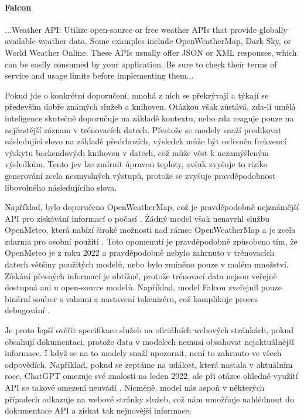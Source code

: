 \documentclass[FM,DP]{tulthesis}
\begin{document}
		\vspace{0.6em}
		\begin{tcolorbox}[colback=white,colframe=black]
			\paragraph{Falcon}
			...Weather API: Utilize open-source or free weather APIs that provide globally available weather data. Some examples include OpenWeatherMap, Dark Sky, or World Weather Online. These APIs usually offer JSON or XML responses, which can be easily consumed by your application. Be sure to check their terms of service and usage limits before implementing them... \cite{falcon_analyza}
		\end{tcolorbox}
		\vspace{0.6em}
		
		Pokud jde o konkrétní doporučení, mnohá z nich se překrývají a týkají se především dobře známých služeb a knihoven. Otázkou však zůstává, zda-li umělá inteligence skutečně doporučuje na základě kontextu, nebo zda reaguje pouze na nejčastější záznam v trénovacích datech. Přestože se modely snaží predikovat následující slovo na základě předchozích, výsledek může být ovlivněn frekvencí výskytu backendových knihoven v datech, což může vést k nezamýšleným výsledkům. Tento jev lze zmírnit úpravou teploty, avšak zvyšuje to riziko generování zcela nesmyslných výstupů, protože se zvyšuje pravděpodobnost libovolného následujícího slova.
		
		Například, bylo doporučeno OpenWeatherMap, což je pravděpodobně nejznámější API pro získávání informací o počasí \cite{bard_analyza} \cite{bingCopilot_analyza} \cite{webapp_basics} \cite{openweather}. Žádný model však nenavrhl službu OpenMeteo, která nabízí široké možnosti nad rámec OpenWeatherMap a je zcela zdarma pro osobní použití \cite{openmeteo}. Toto opomenutí je pravděpodobně způsobeno tím, že OpenMeteo je z roku 2022 a pravděpodobně nebylo zahrnuto v trénovacích datech většiny použitých modelů, nebo bylo zmíněno pouze v malém množství. Získání přesných informací je obtížné, protože trénovací data nejsou veřejně dostupná ani u open-source modelů. Například, model Falcon zveřejnil pouze binární soubor s vahami a nastavení tokenizéru, což komplikuje proces debugování \cite{falcon}.
		
		Je proto lepší ověřit specifikace služeb na oficiálních webových stránkách, pokud obsahují dokumentaci, protože data v modelech nemusí obsahovat nejaktuálnější informace. I když se na to modely snaží upozornit, není to zahrnuto ve všech odpovědích. Například, pokud se zeptáme na událost, která nastala v aktuálním roce, ChatGPT omezuje své znalosti na leden 2022, ale při otázce ohledně využití API se takové omezení neuvádí \cite{chatgpt_knowledge}. Nicméně, model nás aspoň v některých případech odkazuje na webové stránky služeb, což nám umožňuje nahlédnout do dokumentace API a získat tak nejnovější informace.
		
\end{document}
